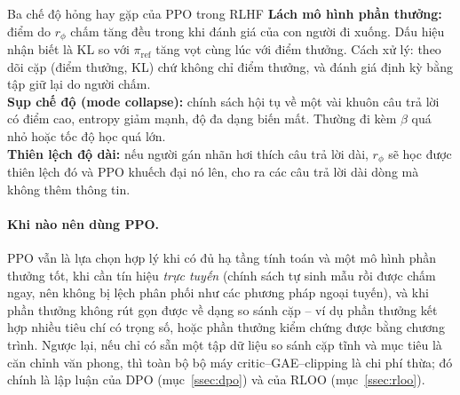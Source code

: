 \begin{pitfall}{Ba chế độ hỏng hay gặp của PPO trong RLHF}
\textbf{Lách mô hình phần thưởng:} điểm do \( r_{\phi} \) chấm tăng đều trong khi đánh giá của con người đi xuống. Dấu hiệu nhận biết là KL so với \( \pi_{\text{ref}} \) tăng vọt cùng lúc với điểm thưởng. Cách xử lý: theo dõi cặp (điểm thưởng, KL) chứ không chỉ điểm thưởng, và đánh giá định kỳ bằng tập giữ lại do người chấm.\\[4pt]
\textbf{Sụp chế độ (mode collapse):} chính sách hội tụ về một vài khuôn câu trả lời có điểm cao, entropy giảm mạnh, độ đa dạng biến mất. Thường đi kèm \( \beta \) quá nhỏ hoặc tốc độ học quá lớn.\\[4pt]
\textbf{Thiên lệch độ dài:} nếu người gán nhãn hơi thích câu trả lời dài, \( r_{\phi} \) sẽ học được thiên lệch đó và PPO khuếch đại nó lên, cho ra các câu trả lời dài dòng mà không thêm thông tin.
\end{pitfall}

\paragraph{Khi nào nên dùng PPO.}
PPO vẫn là lựa chọn hợp lý khi có đủ hạ tầng tính toán và một mô hình phần thưởng tốt, khi cần tín hiệu \emph{trực tuyến} (chính sách tự sinh mẫu rồi được chấm ngay, nên không bị lệch phân phối như các phương pháp ngoại tuyến), và khi phần thưởng không rút gọn được về dạng so sánh cặp -- ví dụ phần thưởng kết hợp nhiều tiêu chí có trọng số, hoặc phần thưởng kiểm chứng được bằng chương trình. Ngược lại, nếu chỉ có sẵn một tập dữ liệu so sánh cặp tĩnh và mục tiêu là căn chỉnh văn phong, thì toàn bộ bộ máy critic--GAE--clipping là chi phí thừa; đó chính là lập luận của DPO (mục~\ref{ssec:dpo}) và của RLOO (mục~\ref{ssec:rloo}).

